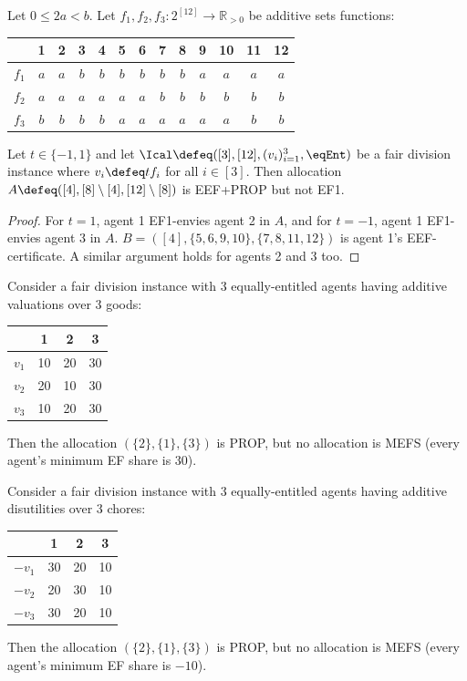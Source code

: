 \begin{lemma}
\label{cex:eef-not-ef1-bival}
Let $0 \le 2a < b$. Let $f_1, f_2, f_3: 2^{[12]} \to \mathbb{R}_{>0}$ be additive sets functions:

\begin{tabular}{c|cccc|cccc|cccc}
& 1 & 2 & 3 & 4 & 5 & 6 & 7 & 8 & 9 & 10 & 11 & 12
\\ \hline $f_1$ & $a$ & $a$ & $b$ & $b$ & $b$ & $b$ & $b$ & $b$ & $a$ & $a$ & $a$ & $a$
\\ $f_2$ & $a$ & $a$ & $a$ & $a$ & $a$ & $a$ & $b$ & $b$ & $b$ & $b$ & $b$ & $b$
\\ $f_3$ & $b$ & $b$ & $b$ & $b$ & $a$ & $a$ & $a$ & $a$ & $a$ & $a$ & $b$ & $b$
\end{tabular}

Let $t \in \{-1, 1\}$ and let $\Ical \defeq ([3], [12], (v_i)_{i=1}^3, \eqEnt)$
be a fair division instance where $v_i \defeq tf_i$ for all $i \in [3]$.
Then allocation
$A \defeq ([4], [8] \setminus [4], [12] \setminus [8])$ is EEF+PROP but not EF1.
\end{lemma}
\begin{proof}
For $t = 1$, agent 1 EF1-envies agent 2 in $A$,
and for $t = -1$, agent 1 EF1-envies agent 3 in $A$.
$B = ([4], \{5, 6, 9, 10\}, \{7, 8, 11, 12\})$ is agent 1's EEF-certificate.
A similar argument holds for agents 2 and 3 too.
\end{proof}

\begin{example}
\label{cex:prop-not-mefs-goods}
Consider a fair division instance with 3 equally-entitled agents
having additive valuations over 3 goods:

\begin{tabular}{c|ccc}
& 1 & 2 & 3
\\ \hline $v_1$ & 10 & 20 & 30
\\ $v_2$ & 20 & 10 & 30
\\ $v_3$ & 10 & 20 & 30
\end{tabular}

Then the allocation $(\{2\}, \{1\}, \{3\})$ is PROP, but no allocation is MEFS
(every agent's minimum EF share is 30).
\end{example}

\begin{example}
\label{cex:prop-not-mefs-chores}
Consider a fair division instance with 3 equally-entitled agents
having additive disutilities over 3 chores:

\begin{tabular}{c|ccc}
& 1 & 2 & 3
\\ \hline $-v_1$ & 30 & 20 & 10
\\ $-v_2$ & 20 & 30 & 10
\\ $-v_3$ & 30 & 20 & 10
\end{tabular}

Then the allocation $(\{2\}, \{1\}, \{3\})$ is PROP, but no allocation is MEFS
(every agent's minimum EF share is $-10$).
\end{example}

